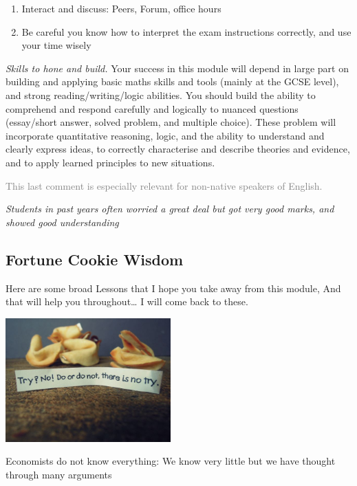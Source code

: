 \documentclass[]{article}
\begin{document}
\begin{enumerate}
\def\labelenumi{\arabic{enumi}.}
\setcounter{enumi}{2}
\item
  Interact and discuss: Peers, Forum, office hours
\item
  Be careful you know how to interpret the exam instructions correctly,
  and use your time wisely
\end{enumerate}

\emph{Skills to hone and build.} Your success in this module will depend
in large part on building and applying basic maths skills and tools
(mainly at the GCSE level), and strong reading/writing/logic abilities.
You should build the ability to comprehend and respond carefully and
logically to nuanced questions (essay/short answer, solved problem, and
multiple choice). These problem will incorporate quantitative reasoning,
logic, and the ability to understand and clearly express ideas, to
correctly characterise and describe theories and evidence, and to apply
learned principles to new situations.

\textcolor{gray}{This last comment is especially relevant for non-native speakers of English.}

\emph{Students in past years often worried a great deal but got very
good marks, and showed good understanding}

\hypertarget{fortune-cookie-wisdom}{%
\subsection{Fortune Cookie Wisdom}\label{fortune-cookie-wisdom}}

Here are some broad Lessons that I hope you take away from this module,
And that will help you throughout\ldots{} I will come back to these.

\includegraphics[width=2.5in]{picsfigs/fortunecookieyoda.jpg}

\textrm{Economists do not know everything: We know very little but we have thought through many arguments}
\end{document}
